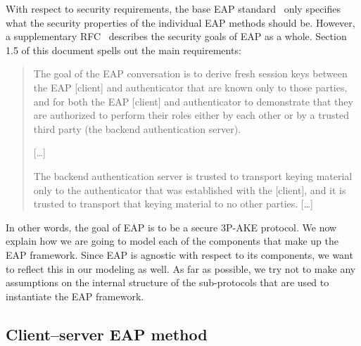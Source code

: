 With respect to security requirements,
the base EAP standard~\cite{IETF:RFC3748:EAP} only specifies what the security properties of the individual EAP methods should be.
However,
a supplementary RFC~\cite{IETF:RFC5247:EAP-key-management} describes the security goals of EAP as a whole.  
Section 1.5 of this document spells out the main requirements:
\begin{quote}

	The goal of the EAP conversation is to derive fresh session keys
   between the EAP [client] and authenticator that are known only to those
   parties, and for both the EAP [client] and authenticator to demonstrate
   that they are authorized to perform their roles either by each other
   or by a trusted third party (the backend authentication server).
   
%  

	[\dots]
   
   The backend authentication server is trusted to transport keying
  material only to the authenticator that was established with the
  [client], and it is trusted to transport that keying material to no other
  parties. [\dots] 

\end{quote}

In other words,
the goal of EAP is to be a secure 3P-AKE protocol.
We now explain how we are going to model each of the components that make up the EAP framework.
Since EAP is agnostic with respect to its components,
we want to reflect this in our modeling as well.
As far as possible,
we try not to make any assumptions on the internal structure of the sub-protocols that are used to instantiate the EAP framework.


\subsection{Client--server EAP method}\label{sec:generic_composition_results:modeling_EAP:EAP_method}

